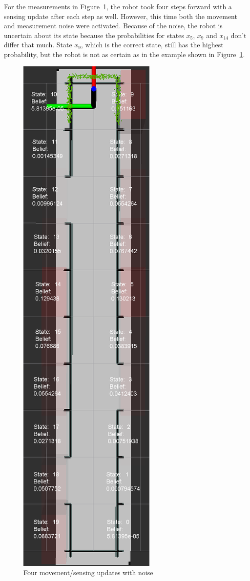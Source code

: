 \documentclass[10pt,a4paper]{article}
\begin{document}
For the measurements in Figure~\ref{fig:4stepsNoise}, the robot took four steps forward with a sensing update after each step as well. However, this time both the movement and measurement noise were activated. Because of the noise, the robot is uncertain about its state because the probabilities for states \textit{$x_5$}, \textit{$x_9$} and \textit{$x_{14}$} don't differ that much. State \textit{$x_9$}, which is the correct state, still has the highest probability, but the robot is not as certain as in the example shown in Figure~\ref{fig:4stepsNoise}.

\begin{figure}[h]
	\centering
	\includegraphics[scale=0.9]{4stepsforwardNoise.png}
	\caption{Four movement/sensing updates with noise}
	\label{fig:4stepsNoise}
\end{figure}
\end{document}
